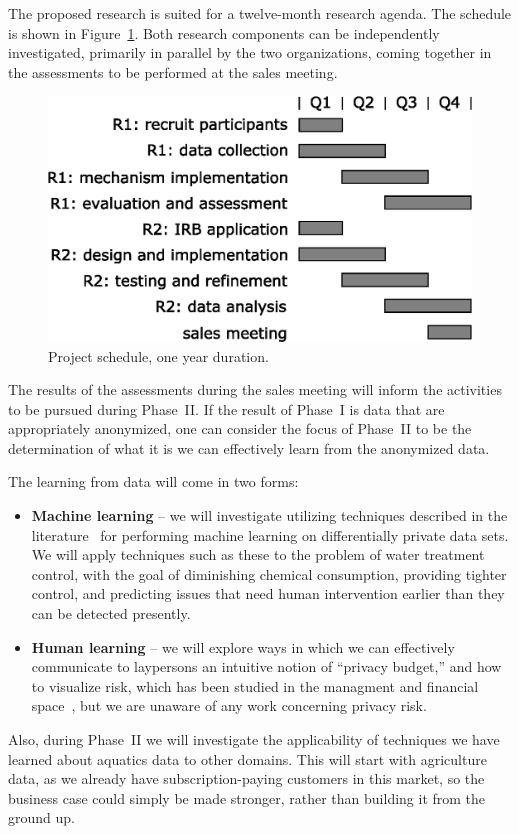 The proposed research is suited for a twelve-month research agenda.
The schedule is shown in Figure~\ref{fig:gantt}.
Both research components can be independently investigated,
primarily in parallel by the two organizations, coming together
in the assessments to be performed at the sales meeting.

\begin{figure}[h]
 \center
\includegraphics[width=0.6\columnwidth]{gantt}
    \caption{Project schedule, one year duration.}
    \label{fig:gantt}
\end{figure}

The results of the assessments during the sales meeting will inform
the activities to be pursued during Phase~II.
If the result of Phase~I is data that are appropriately anonymized,
one can consider the focus of Phase~II to be the determination of
what it is we can effectively learn from the anonymized data.

The learning from data will come in two forms:
\begin{itemize}
\item {\bf Machine learning} -- we will investigate utilizing techniques
described in the literature~\cite{acgmmtz16,fs10,ss15} for performing machine
learning on differentially private data sets.
We will apply techniques such as these to the problem of water treatment
control, with the goal of diminishing chemical consumption, providing
tighter control, and predicting issues that need human intervention
earlier than they can be detected presently.
\item {\bf Human learning} -- we will explore ways in which we can effectively
communicate to laypersons an intuitive notion of ``privacy budget,'' and
how to visualize risk, which has been studied in the
managment and
financial space~\cite{Eppler09,Sarlin16}, but we are unaware of any
work concerning privacy risk.
\end{itemize}

Also, during Phase~II we will investigate the applicability of techniques
we have learned about aquatics data to other domains.  This will start with
agriculture data, as we already have subscription-paying customers in
this market, so the business case could simply be made stronger, rather
than building it from the ground up.
